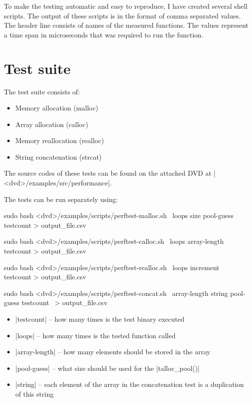 \noindent
To make the testing automatic and easy to reproduce, I have created several
shell scripts. The output of these scripts is in the format of comma separated
values. The header line consists of names of the measured functions. The values
represent a time span in microseconds that was required to run the function.

\section{Test suite}

The test suite consists of:
\begin{itemize}
  \item Memory allocation (malloc)
  \item Array allocation (calloc)
  \item Memory reallocation (realloc)
  \item String concatenation (strcat)
\end{itemize}

\noindent
The source codes of these tests can be found on the attached DVD at
|<dvd>/examples/src/performance|.

\funclistend
The tests can be run separately using:
\begin{commandline}
sudo bash <dvd>/examples/scripts/perftest-malloc.sh \
     loops size pool-guess testcount > output_file.csv

sudo bash <dvd>/examples/scripts/perftest-calloc.sh \
     loops array-length testcount > output_file.csv

sudo bash <dvd>/examples/scripts/perftest-realloc.sh \
     loops increment testcount > output_file.csv

sudo bash <dvd>/examples/scripts/perftest-concat.sh \
     array-length string pool-guess testcount \
     > output_file.csv
\end{commandline}
\begin{itemize}
  \item |testcount| -- how many times is the test binary executed
  \item |loops| -- how many times is the tested function called
  \item |array-length| -- how many elements should be stored in the array
  \item |pool-guess| -- what size should be used for the |talloc_pool()|
  \item |string| -- each element of the array in the concatenation test is
  a duplication of this string
\end{itemize}

